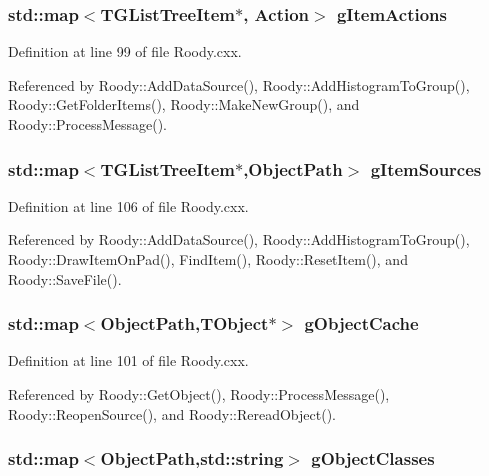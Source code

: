 \subsubsection[{gItemActions}]{\setlength{\rightskip}{0pt plus 5cm}std::map$<$TGListTreeItem$\ast$, {\bf Action}$>$ {\bf gItemActions}}\label{Roody_8cxx_a48bffd501d6381c5876ae14bfaee41cf}


Definition at line 99 of file Roody.cxx.



Referenced by Roody::AddDataSource(), Roody::AddHistogramToGroup(), Roody::GetFolderItems(), Roody::MakeNewGroup(), and Roody::ProcessMessage().

\subsubsection[{gItemSources}]{\setlength{\rightskip}{0pt plus 5cm}std::map$<$TGListTreeItem$\ast$,ObjectPath$>$ {\bf gItemSources}}\label{Roody_8cxx_af77fd30c760f8c2c99d2f9b8e1f99c00}


Definition at line 106 of file Roody.cxx.



Referenced by Roody::AddDataSource(), Roody::AddHistogramToGroup(), Roody::DrawItemOnPad(), FindItem(), Roody::ResetItem(), and Roody::SaveFile().

\subsubsection[{gObjectCache}]{\setlength{\rightskip}{0pt plus 5cm}std::map$<$ObjectPath,TObject$\ast$$>$ {\bf gObjectCache}}\label{Roody_8cxx_a82dfd284f9a1cee6b3b751ed52c8fcc2}


Definition at line 101 of file Roody.cxx.



Referenced by Roody::GetObject(), Roody::ProcessMessage(), Roody::ReopenSource(), and Roody::RereadObject().

\subsubsection[{gObjectClasses}]{\setlength{\rightskip}{0pt plus 5cm}std::map$<$ObjectPath,std::string$>$ {\bf gObjectClasses}}\label{Roody_8cxx_ab15243e54e971d543df4cc286b5733d0}


